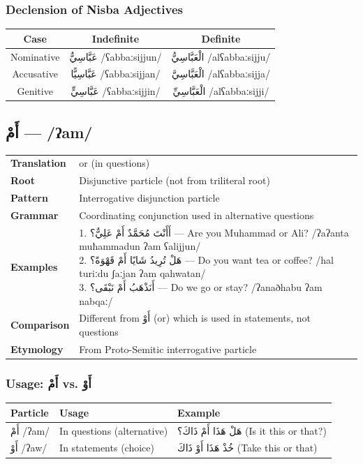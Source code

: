 \documentclass[letterpaper,12pt]{article}
\begin{document}
\subsubsection*{Declension of Nisba Adjectives}
\begin{tabular}{|c|c|c|}
\hline
\textbf{Case} & \textbf{Indefinite} & \textbf{Definite} \\
\hline
Nominative & \textarabic{عَبَّاسِيٌّ} /ʕabbaːsijjun/ & \textarabic{الْعَبَّاسِيُّ} /alʕabbaːsijju/ \\
\hline
Accusative & \textarabic{عَبَّاسِيًّا} /ʕabbaːsijjan/ & \textarabic{الْعَبَّاسِيَّ} /alʕabbaːsijja/ \\
\hline
Genitive & \textarabic{عَبَّاسِيٍّ} /ʕabbaːsijjin/ & \textarabic{الْعَبَّاسِيِّ} /alʕabbaːsijji/ \\
\hline
\end{tabular}

\subsection{\textarabic{أَمْ} — /ʔam/}
\begin{tabular}{p{3cm}p{10cm}}
\toprule
\textbf{Translation} & or (in questions) \\
\textbf{Root} & Disjunctive particle (not from triliteral root) \\
\textbf{Pattern} & Interrogative disjunction particle \\
\textbf{Grammar} & Coordinating conjunction used in alternative questions \\
\midrule
\textbf{Examples} & \makecell[l]{\parbox{9.5cm}{
1. \textarabic{أَأَنْتَ مُحَمَّدٌ أَمْ عَلِيٌّ؟} — Are you Muhammad or Ali? /ʔaʔanta muħammadun ʔam ʕalijjun/\\
2. \textarabic{هَلْ تُرِيدُ شَايًا أَمْ قَهْوَةً؟} — Do you want tea or coffee? /hal turiːdu ʃaːjan ʔam qahwatan/\\
3. \textarabic{أَنَذْهَبُ أَمْ نَبْقَى؟} — Do we go or stay? /ʔanaðhabu ʔam nabqaː/
}} \\
\midrule
\textbf{Comparison} & Different from \textarabic{أَوْ} (or) which is used in statements, not questions \\
\textbf{Etymology} & From Proto-Semitic interrogative particle \\
\bottomrule
\end{tabular}

\subsubsection*{Usage: \textarabic{أَمْ} vs. \textarabic{أَوْ}}
\begin{tabular}{|l|p{5cm}|p{5cm}|}
\hline
\textbf{Particle} & \textbf{Usage} & \textbf{Example} \\
\hline
\textarabic{أَمْ} /ʔam/ & In questions (alternative) & \textarabic{هَلْ هَذَا أَمْ ذَاكَ؟} (Is it this or that?) \\
\hline
\textarabic{أَوْ} /ʔaw/ & In statements (choice) & \textarabic{خُذْ هَذَا أَوْ ذَاكَ} (Take this or that) \\
\hline
\end{tabular}
\end{document}

